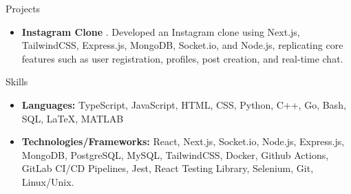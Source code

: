 \documentclass[]{mcdowellcv}
\begin{document}
	\begin{cvsection}{Projects}
		\begin{cvsubsection}{}{}{}
			\begin{itemize}
				\item \textbf{Instagram Clone} \href{https://github.com/pl3lee/instagram-clone}{\faGithub}. Developed an Instagram clone using Next.js, TailwindCSS, Express.js, MongoDB, Socket.io, and Node.js, replicating core features such as user registration, profiles, post creation, and real-time chat.
			\end{itemize}
		\end{cvsubsection}
	\end{cvsection}

	\begin{cvsection}{Skills}
		\begin{cvsubsection}{}{}{}	
			\begin{itemize}
				\item \textbf{Languages:} TypeScript, JavaScript, HTML, CSS, Python, C++, Go, Bash, SQL, LaTeX, MATLAB
				\item \textbf{Technologies/Frameworks:} React, Next.js, Socket.io, Node.js, Express.js, MongoDB, PostgreSQL, MySQL, TailwindCSS, Docker, Github Actions, GitLab CI/CD Pipelines, Jest, React Testing Library, Selenium, Git, Linux/Unix.
			\end{itemize}
		\end{cvsubsection}
	\end{cvsection}
	
	
	
	
\end{document}
